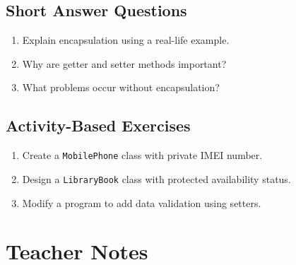 \subsection{Short Answer Questions}

\begin{enumerate}
    \item Explain encapsulation using a real-life example.
    \item Why are getter and setter methods important?
    \item What problems occur without encapsulation?
\end{enumerate}

\subsection{Activity-Based Exercises}

\begin{enumerate}
    \item Create a \texttt{MobilePhone} class with private IMEI number.
    \item Design a \texttt{LibraryBook} class with protected availability status.
    \item Modify a program to add data validation using setters.
\end{enumerate}

\section{Teacher Notes}

